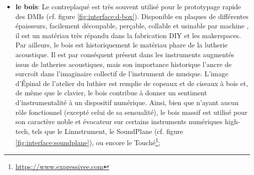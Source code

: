 \begin{itemize}[noitemsep]
	\item \textbf{le bois}: Le contreplaqué est très souvent utilisé pour le prototypage rapide des \glspl{DMI} (cf. figure \ref{fig:interface:d-box}). Disponible en plaques de différentes épaisseurs, facilement découpable, perçable, collable et usinable par machine , il est un matériau très répandu dans la fabrication \gls{DIY} et les \glspl{makerspace}. Par ailleurs, le bois est historiquement le matériau phare de la lutherie acoustique. Il est par conséquent présent dans les instruments augmentés issus de lutheries acoustiques, mais son importance historique l'ancre de surcroît dans l'imaginaire collectif de l'instrument de musique. L'image d'Épinal de l'atelier du luthier est remplie de copeaux et de ciseaux à bois et, de même que le clavier, le bois contribue à donner un sentiment d'instrumentalité à un dispositif numérique. Ainsi, bien que n'ayant aucun rôle fonctionnel (excepté celui de sa sensualité), le bois massif est utilisé pour son caractère noble et évocateur sur certains instruments numériques high-tech, tels que le Linnstrument, le SoundPlane (cf. figure \ref{fig:interface:soundplane}), ou encore le Touché\footnote{\url{https://www.expressivee.com}};
	\begin{figure}[!htbp]
\end{figure}
\end{itemize}

